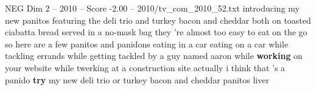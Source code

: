 \begin{textsample}{NEG Dim 2 – 2010 – Score -2.00 – 2010/tv\_com\_2010\_52.txt}  \label{ex:f2_neg_055}
introducing my new panitos featuring the deli trio and turkey bacon and cheddar both on toasted ciabatta bread served in a no-mask bag they 're almost too easy to eat on the go so here are a few panitos and panidons eating in a car eating on a car while tackling errands while getting tackled by a guy named aaron while \textbf{working} on your website while twerking at a construction site actually i think that 's a panido \textbf{try} my new deli trio or turkey bacon and cheddar panitos liver

\end{textsample}
